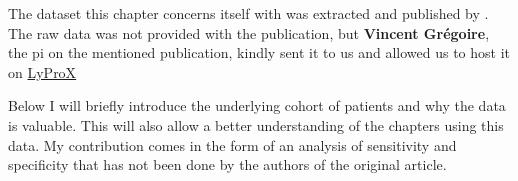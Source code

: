 \begin{tcolorbox}[title=\faIcon{users} Contributions, parbox=false]
    The dataset this chapter concerns itself with was extracted and published by . The raw data was not provided with the publication, but  \textbf{Vincent Grégoire}, the \gls{pi} on the mentioned publication, kindly sent it to us and allowed us to host it on \href{https://lyprox.org}{ LyProX}

    Below I will briefly introduce the underlying cohort of patients and why the data is valuable. This will also allow a better understanding of the chapters using this data. My contribution comes in the form of an analysis of sensitivity and specificity that has not been done by the authors of the original article.
\end{tcolorbox}
